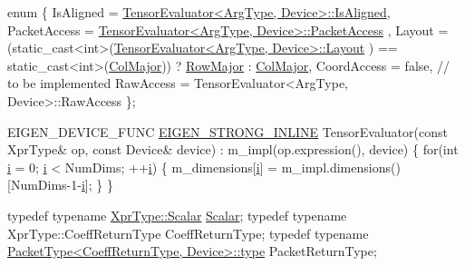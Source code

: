 \begin{DoxyCodeInclude}
  \textcolor{keyword}{enum} \{
    IsAligned = \hyperlink{struct_eigen_1_1_tensor_evaluator_a89a733eacb0dd8a051fb66c5ce66d2f0a30fab453af3547d159853340be439a38}{TensorEvaluator<ArgType, Device>::IsAligned},
    PacketAccess = \hyperlink{struct_eigen_1_1_tensor_evaluator_a89a733eacb0dd8a051fb66c5ce66d2f0af2762e97058bc608b68a22f4b1b04e93}{TensorEvaluator<ArgType, Device>::PacketAccess}
      ,
    Layout = (\textcolor{keyword}{static\_cast<}\textcolor{keywordtype}{int}\textcolor{keyword}{>}(\hyperlink{struct_eigen_1_1_tensor_evaluator_a89a733eacb0dd8a051fb66c5ce66d2f0aad2f498adfc79da8b4728669ac46f653}{TensorEvaluator<ArgType, Device>::Layout}
      ) == static\_cast<int>(\hyperlink{group__enums_ggaacded1a18ae58b0f554751f6cdf9eb13a0cbd4bdd0abcfc0224c5fcb5e4f6669a}{ColMajor})) ? \hyperlink{group__enums_ggaacded1a18ae58b0f554751f6cdf9eb13acfcde9cd8677c5f7caf6bd603666aae3}{RowMajor} : \hyperlink{group__enums_ggaacded1a18ae58b0f554751f6cdf9eb13a0cbd4bdd0abcfc0224c5fcb5e4f6669a}{ColMajor},
    CoordAccess = \textcolor{keyword}{false},  \textcolor{comment}{// to be implemented}
    RawAccess = TensorEvaluator<ArgType, Device>::RawAccess
  \};

  EIGEN\_DEVICE\_FUNC \hyperlink{eigen_2_eigen_2src_2_core_2util_2_macros_8h_af2b60117c00a6e75812de43bfe7db3b1}{EIGEN\_STRONG\_INLINE} TensorEvaluator(\textcolor{keyword}{const} XprType& op, \textcolor{keyword}{const} Device&
       device)
      : m\_impl(op.expression(), device)
  \{
    \textcolor{keywordflow}{for}(\textcolor{keywordtype}{int} \hyperlink{eigen_2doc_2snippets_2_bi_c_g_s_t_a_b__step__by__step_8cpp_a6f6ccfcf58b31cb6412107d9d5281426}{i} = 0; \hyperlink{eigen_2doc_2snippets_2_bi_c_g_s_t_a_b__step__by__step_8cpp_a6f6ccfcf58b31cb6412107d9d5281426}{i} < NumDims; ++\hyperlink{eigen_2doc_2snippets_2_bi_c_g_s_t_a_b__step__by__step_8cpp_a6f6ccfcf58b31cb6412107d9d5281426}{i}) \{
      m\_dimensions[\hyperlink{eigen_2doc_2snippets_2_bi_c_g_s_t_a_b__step__by__step_8cpp_a6f6ccfcf58b31cb6412107d9d5281426}{i}] = m\_impl.dimensions()[NumDims-1-\hyperlink{eigen_2doc_2snippets_2_bi_c_g_s_t_a_b__step__by__step_8cpp_a6f6ccfcf58b31cb6412107d9d5281426}{i}];
    \}
  \}

  \textcolor{keyword}{typedef} \textcolor{keyword}{typename} \hyperlink{eigen_2bench_2bench__gemm_8cpp_a052eb942d12b6404aade6fae4b075fb9}{XprType::Scalar} \hyperlink{eigen_2bench_2bench__gemm_8cpp_a052eb942d12b6404aade6fae4b075fb9}{Scalar};
  \textcolor{keyword}{typedef} \textcolor{keyword}{typename} XprType::CoeffReturnType CoeffReturnType;
  \textcolor{keyword}{typedef} \textcolor{keyword}{typename} \hyperlink{struct_eigen_1_1_packet_type_a3408a66e0894db9cb51e39dbf4fe9f0f}{PacketType<CoeffReturnType, Device>::type} 
      PacketReturnType;


\end{DoxyCodeInclude}

